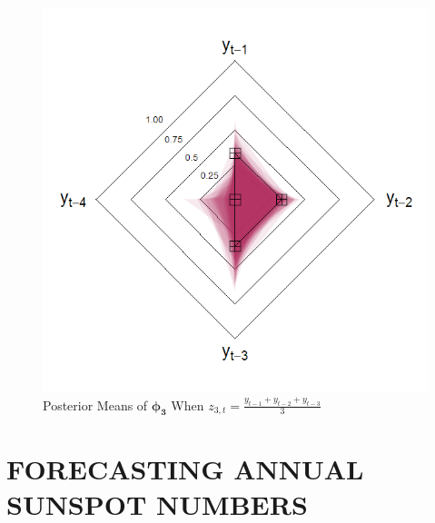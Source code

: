 \begin{figure}[!h]
\begin{minipage}[h]{0.4\textwidth}
\end{minipage}
\begin{minipage}[h]{0.8\textwidth}
\caption{Posterior Means of $\bm{\phi_3}$ When $z_{3,t}=\frac{y_{t-1}+y_{t-2}+y_{t-3}}{3}$}
\label{fig:th3}
\center
\includegraphics[scale=0.32]{hsthvar3}
\end{minipage}
\end{figure}




\section{FORECASTING ANNUAL SUNSPOT NUMBERS}

